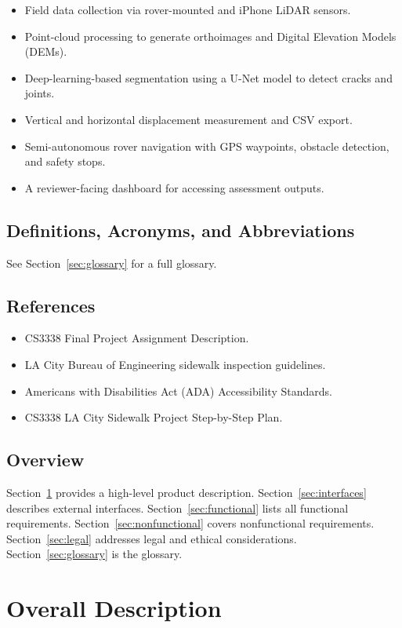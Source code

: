 \documentclass{article}
\begin{document}
\begin{itemize}
  \item Field data collection via rover-mounted and iPhone LiDAR sensors.
  \item Point-cloud processing to generate orthoimages and Digital Elevation Models (DEMs).
  \item Deep-learning-based segmentation using a U-Net model to detect cracks and joints.
  \item Vertical and horizontal displacement measurement and CSV export.
  \item Semi-autonomous rover navigation with GPS waypoints, obstacle detection, and safety stops.
  \item A reviewer-facing dashboard for accessing assessment outputs.
\end{itemize}

\subsection{Definitions, Acronyms, and Abbreviations}
See Section~\ref{sec:glossary} for a full glossary.

\subsection{References}
\begin{itemize}
  \item CS3338 Final Project Assignment Description.
  \item LA City Bureau of Engineering sidewalk inspection guidelines.
  \item Americans with Disabilities Act (ADA) Accessibility Standards.
  \item CS3338 LA City Sidewalk Project Step-by-Step Plan.
\end{itemize}

\subsection{Overview}
Section~\ref{sec:overall} provides a high-level product description. Section~\ref{sec:interfaces}
describes external interfaces. Section~\ref{sec:functional} lists all functional requirements.
Section~\ref{sec:nonfunctional} covers nonfunctional requirements. Section~\ref{sec:legal} addresses
legal and ethical considerations. Section~\ref{sec:glossary} is the glossary.


\section{Overall Description}
\label{sec:overall}
\end{document}
